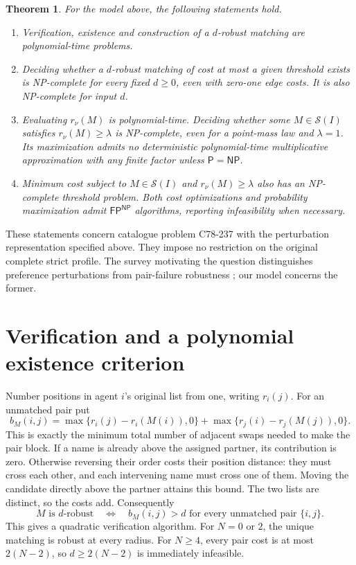 \documentclass[11pt]{article}
\newtheorem{theorem}{Theorem}
\newcommand{\NP}{\mathsf{NP}}
\newcommand{\FP}{\mathsf{FP}}
\begin{document}
\begin{theorem}\label{classification}
For the model above, the following statements hold.
\begin{enumerate}
\item Verification, existence and construction of a $d$-robust matching
      are polynomial-time problems.
\item Deciding whether a $d$-robust matching of cost at most a given
      threshold exists is NP-complete for every fixed $d\geq0$, even
      with zero-one edge costs. It is also NP-complete for input $d$.
\item Evaluating $r_\nu(M)$ is polynomial-time. Deciding whether some
      $M\in\mathcal S(I)$ satisfies $r_\nu(M)\geq\lambda$ is NP-complete,
      even for a point-mass law and $\lambda=1$. Its maximization admits
      no deterministic polynomial-time multiplicative approximation
      with any finite factor unless $\mathsf P=\NP$.
\item Minimum cost subject to $M\in\mathcal S(I)$ and
      $r_\nu(M)\geq\lambda$ also has an NP-complete threshold problem.
      Both cost optimizations and probability maximization admit
      $\FP^{\NP}$ algorithms, reporting infeasibility when necessary.
\end{enumerate}
\end{theorem}

These statements concern catalogue problem C78-237 with the perturbation
representation specified above. They impose no restriction on the
original complete strict profile. The survey motivating the question
distinguishes preference perturbations from pair-failure robustness
\cite[\S3.3.2]{survey}; our model concerns the former.

\section{Verification and a polynomial existence criterion}
Number positions in agent $i$'s original list from one, writing $r_i(j)$.
For an unmatched pair put
\[
 b_M(i,j)=\max\{r_i(j)-r_i(M(i)),0\}
          +\max\{r_j(i)-r_j(M(j)),0\}.
\]
This is exactly the minimum total number of adjacent swaps needed to
make the pair block. If a name is already above the assigned partner,
its contribution is zero. Otherwise reversing their order costs their
position distance: they must cross each other, and each intervening
name must cross one of them. Moving the candidate directly above the
partner attains this bound. The two lists are distinct, so the costs add.
Consequently
\begin{equation}\label{radius}
 M\text{ is }d\text{-robust}
 \quad\Longleftrightarrow\quad
 b_M(i,j)>d\text{ for every unmatched pair }\{i,j\}.
\end{equation}
This gives a quadratic verification algorithm. For $N=0$ or $2$, the
unique matching is robust at every radius. For $N\geq4$, every pair cost
is at most $2(N-2)$, so $d\geq2(N-2)$ is immediately infeasible.
\end{document}
